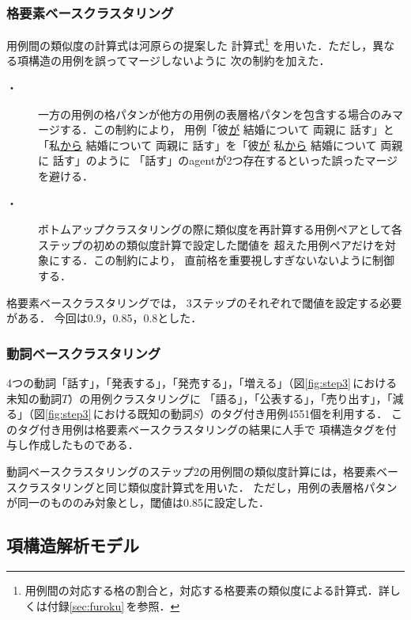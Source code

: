 \subsubsection{格要素ベースクラスタリング}
\label{sssec:cl1}

用例間の類似度の計算式は河原ら\citeyear{kawahara:02:a}の提案した
計算式\footnote{
用例間の対応する格の割合と，対応する格要素の類似度による計算式．詳しくは付録\ref{sec:furoku}\,を参照．
}
を用いた．ただし，異なる項構造の用例を誤ってマージしないように
次の制約を加えた．\\

\begin{description}
\item[・]一方の用例の格パタンが他方の用例の表層格パタンを包含する場合のみマージする．この制約により，
用例「彼\underline{が} 結婚について 両親に 話す」と
「私\underline{から} 結婚について 両親に 話す」を「彼\underline{が} 私\underline{から} 結婚について 両親に 話す」のように
「話す」のagentが2つ存在するといった誤ったマージを避ける．
\item[・]ボトムアップクラスタリングの際に類似度を再計算する用例ペアとして各ステップの初めの類似度計算で設定した閾値を
超えた用例ペアだけを対象にする．この制約により，
直前格を重要視しすぎないないように制御する．
\end{description}

格要素ベースクラスタリングでは，
3ステップのそれぞれで閾値を設定する必要がある．
今回は0.9，0.85，0.8とした．


\subsubsection{動詞ベースクラスタリング}

4つの動詞「話す」，「発表する」，「発売する」，「増える」（図\ref{fig:step3}\,における未知の動詞$T$）の用例クラスタリングに
「語る」，「公表する」，「売り出す」，「減る」（図\ref{fig:step3}\,における既知の動詞$S$）のタグ付き用例4551個を利用する．
このタグ付き用例は格要素ベースクラスタリングの結果に人手で
項構造タグを付与し作成したものである．

動詞ベースクラスタリングのステップ2の用例間の類似度計算には，格要素ベースクラスタリングと同じ類似度計算式を用いた．
ただし，用例の表層格パタンが同一のもののみ対象とし，閾値は0.85に設定した．


\subsection{項構造解析モデル}
\label{ssec:asa}

